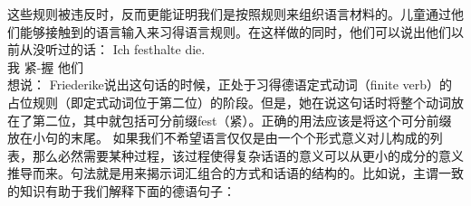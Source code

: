 这些规则被违反时，反而更能证明我们是按照规则来组织语言材料的。儿童通过他们能够接触到的语言输入来习得语言规则。在这样做的同时，他们可以说出他们以前从没听过的话：
\ea
\settowidth{}
\gll Ich festhalte die. \\
     我 紧-握 他们\\
\glt 想说：
\z
Friederike说出这句话的时候，正处于习得德语定式动词（finite verb）的占位规则（即定式动词位于第二位）的阶段。但是，她在说这句话时将整个动词放在了第二位，其中就包括可分前缀fest（紧）。正确的用法应该是将这个可分前缀放在小句的末尾。
如果我们不希望语言仅仅是由一个个形式意义对儿构成的列表，那么必然需要某种过程，该过程使得复杂话语的意义可以从更小的成分的意义推导而来。句法就是用来揭示词汇组合的方式和话语的结构的。比如说，主谓一致的知识有助于我们解释下面的德语句子：

